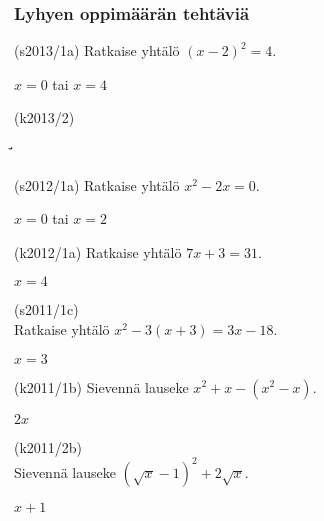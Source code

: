 \subsubsection*{Lyhyen oppimäärän tehtäviä}

\begin{multicols}{2}

\begin{tehtava}
(s2013/1a) Ratkaise yhtälö $(x-2)^2=4$.
\begin{vastaus}
$x=0$ tai $x=4$ 
\end{vastaus}
\end{tehtava}

\begin{tehtava}
(k2013/2)
\begin{vastaus}
\end{vastaus}
\end{tehtava}̈́

\begin{tehtava}
(s2012/1a) Ratkaise yhtälö $x^2-2x = 0$.
\begin{vastaus}
$x=0$ tai $x=2$
\end{vastaus}
\end{tehtava}

\begin{tehtava}
(k2012/1a) Ratkaise yhtälö $7x+3 = 31$.
\begin{vastaus}
$x = 4$
\end{vastaus}
\end{tehtava}

\begin{tehtava}
(s2011/1c) \\ Ratkaise yhtälö $x^2-3(x+3) = 3x-18$.
\begin{vastaus}
$x=3$
\end{vastaus}
\end{tehtava}


\begin{tehtava}
(k2011/1b) Sievennä lauseke $x^2+x-(x^2-x)$.
\begin{vastaus}
$2x$
\end{vastaus}
\end{tehtava}

\begin{tehtava}
(k2011/2b) \\ Sievennä lauseke $(\sqrt{x}-1)^2+2\sqrt{x}$.
\begin{vastaus}
$x+1$
\end{vastaus}
\end{tehtava}

\end{multicols}

